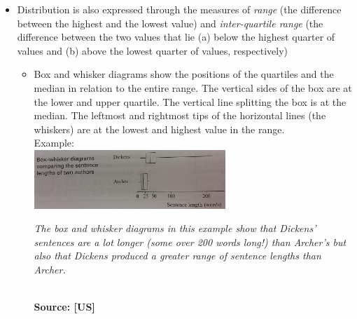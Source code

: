   
\begin{itemize}
\item Distribution is also expressed through the measures of \emph{range} (the difference between the highest and the lowest value) and \emph{inter-quartile range} (the difference between the two values that lie (a) below the highest quarter of values and (b) above the lowest quarter of values, respectively)

\begin{itemize}
\item Box and whisker diagrams show the positions of the quartiles and the median in relation to the entire range. The vertical sides of the box are at the lower and upper quartile. The vertical line splitting the box is at the median. The leftmost and rightmost tips of the horizontal lines (the whiskers) are at the lowest and highest value in the range. \\ [0.5ex]
  Example: \\
  \includegraphics[width=0.6\textwidth]{BoxDiagramExample_c.jpg}\hspace{1ex} \parbox[t]{0.25\textwidth}{\vspace{-17ex}\tiny\emph{The box and whisker diagrams in this example show that Dickens' sentences are a lot longer (some over 200 words long!) than Archer's but also that Dickens produced a greater range of sentence lengths than Archer. }} \\ [-2ex]
   {\fontsize{10}{0}\selectfont \textbf{Source: [US]}}
\end{itemize}
\end{itemize}

